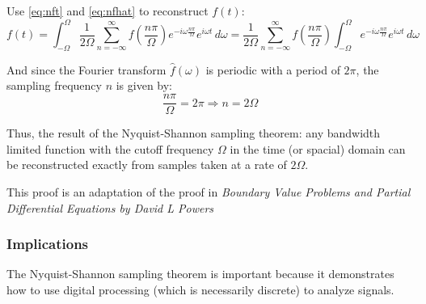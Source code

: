 \documentclass[12pt]{article}
\newcommand{\inftyint}{\int_{-\infty}^{\infty}}
\begin{document}
Use \eqref{eq:nft} and \eqref{eq:nfhat} to reconstruct \( f(t)  \):
\begin{equation} \label{eq:ndtft} f(t) = \int_{-\Omega}^{\Omega}
    \frac{1}{2\Omega} \sum_{n = -\infty}^{\infty} f(\frac{n\pi}{\Omega})e^{-i
    \omega \frac{n \pi}{\Omega} } e^{i\omega t} \,d\omega = \frac{1}{2\Omega}
    \sum_{n = -\infty}^{\infty} f(\frac{n\pi}{\Omega}) \int_{-\Omega}^{\Omega}
    e^{-i \omega \frac{n \pi}{\Omega} } e^{i\omega t} \, d\omega \end{equation}

And since the Fourier transform \( \hat{f}(\omega) \) is periodic with a period
of \( 2\pi\), the sampling frequency \( n\) is given by: \[ \frac{n\pi}{\Omega}
= 2\pi \Rightarrow n = 2\Omega\]

Thus, the result of the Nyquist-Shannon sampling theorem: any bandwidth limited
function with the cutoff frequency \( \Omega \) in the time (or spacial) domain
can be reconstructed exactly from samples taken at a rate of \( 2\Omega \).

This proof is an adaptation of the proof in \emph{Boundary Value Problems and
Partial Differential Equations by David L Powers}

%
%


\subsubsection{Implications}

The Nyquist-Shannon sampling theorem is important because it demonstrates how
to use digital processing (which is necessarily discrete) to analyze signals. 
\end{document}
